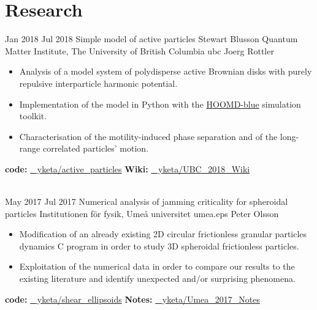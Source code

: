 \documentclass[letterpaper]{cvtemplate} %
\begin{document}
\makeprofile %


\section{Research}

\begin{cvbody}

\cvitem
    	{Jan 2018}
	{Jul 2018}
        {Simple model of active particles}
        {Stewart Blusson Quantum Matter Institute, The University of British Columbia }
        {ubc}
        {Joerg Rottler}
        {\begin{itemize}
        \item Analysis of a model system of polydisperse active Brownian disks with purely repulsive interparticle harmonic potential.
        \item Implementation of the model in Python with the \href{https://glotzerlab.engin.umich.edu/hoomd-blue/}{HOOMD-blue} simulation toolkit.
        \item Characterisation of the motility-induced phase separation and of the long-range correlated particles' motion.\\
        \end{itemize}
        {\bf code:} \href{https://github.com/yketa/active_particles}{\faGithub~ yketa/active\_particles} \hfill {\bf Wiki:} \href{https://github.com/yketa/UBC_2018_Wiki}{\faGithub~ yketa/UBC\_2018\_Wiki}
        }
        \\
        
\cvitem
	{May 2017}
	{Jul 2017}
	{Numerical analysis of jamming criticality for spheroidal particles}
	{Institutionen f\"{o}r fysik, Ume\r{a} universitet }
	{umea.eps}
	{Peter Olsson}
	{\begin{itemize}
	\item Modification of an already existing 2D circular frictionless granular particles dynamics C
program in order to study 3D spheroidal frictionless particles.
	\item Exploitation of the numerical data in order to compare our results to the existing literature
and identify unexpected and/or surprising phenomena.\\
	\end{itemize}
	{\bf code:} \href{https://github.com/yketa/shear_ellipsoids}{\faGithub~ yketa/shear\_ellipsoids} \hfill {\bf Notes:} \href{https://github.com/yketa/Umea_2017_Notes}{\faGithub~ yketa/Umea\_2017\_Notes}
	}
        \\ 


\end{cvbody}
\end{document}
